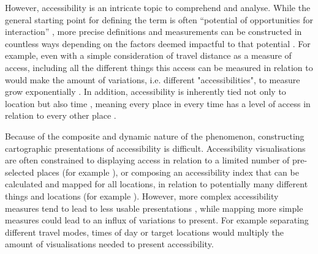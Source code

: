 However, accessibility is an intricate topic to comprehend and analyse.
While the general starting point for defining the term is often
\enquote{potential of opportunities for interaction} \parencite{han1959},  %
more precise definitions and measurements can be constructed in countless ways
depending on the factors deemed impactful to that potential
\parencite{pap2016}.
For example, even with a simple consideration of travel distance as a measure of access,
including all the different things this access can be measured in relation to
would make the amount of variations, i.e. different "accessibilities",
to measure grow exponentially \parencite{lev2020}.
In addition, accessibility is inherently tied not only to location
but also time \parencite{jar2018},
meaning every place in every time has a level of access
in relation to every other place \parencite{lev2020}.

Because of the composite and dynamic nature of the phenomenon,
constructing cartographic presentations of accessibility is difficult.
Accessibility visualisations are often constrained
to displaying access in relation to
a limited number of pre-selected places (for example \textcite{wei2018}),
or composing an accessibility index that can be calculated and mapped for all locations,
in relation to potentially many different things and locations (for example \textcite{kim2019}).
However, more complex accessibility measures tend to lead to
less usable presentations \parencite{te2014},
while mapping more simple measures could lead to an influx of variations to present.
For example separating different travel modes, times of day or target locations
would multiply the amount of visualisations needed to present accessibility.


